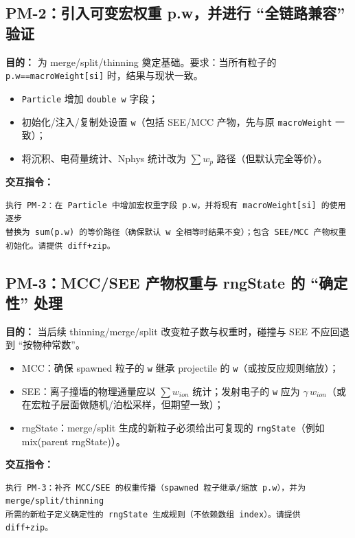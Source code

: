 \documentclass[UTF8,11pt,a4paper]{ctexart}
\begin{document}
\subsection{PM-2：引入可变宏权重 p.w，并进行 ``全链路兼容'' 验证}
\textbf{目的：} 为 merge/split/thinning 奠定基础。要求：当所有粒子的 \texttt{p.w==macroWeight[si]} 时，结果与现状一致。
\begin{itemize}[itemsep=2pt]
  \item \texttt{Particle} 增加 \texttt{double w} 字段；
  \item 初始化/注入/复制处设置 \texttt{w}（包括 SEE/MCC 产物，先与原 \texttt{macroWeight} 一致）；
  \item 将沉积、电荷量统计、Nphys 统计改为 $\sum w_p$ 路径（但默认完全等价）。
\end{itemize}
\textbf{交互指令：}
\begin{verbatim}
执行 PM-2：在 Particle 中增加宏权重字段 p.w，并将现有 macroWeight[si] 的使用逐步
替换为 sum(p.w) 的等价路径（确保默认 w 全相等时结果不变）；包含 SEE/MCC 产物权重
初始化。请提供 diff+zip。
\end{verbatim}

\subsection{PM-3：MCC/SEE 产物权重与 rngState 的 ``确定性'' 处理}
\textbf{目的：} 当后续 thinning/merge/split 改变粒子数与权重时，碰撞与 SEE 不应回退到 ``按物种常数''。
\begin{itemize}[itemsep=2pt]
  \item MCC：确保 spawned 粒子的 \texttt{w} 继承 projectile 的 \texttt{w}（或按反应规则缩放）；
  \item SEE：离子撞墙的物理通量应以 $\sum w_{ion}$ 统计；发射电子的 \texttt{w} 应为 $\gamma\,w_{ion}$（或在宏粒子层面做随机/泊松采样，但期望一致）；
  \item rngState：merge/split 生成的新粒子必须给出可复现的 \texttt{rngState}（例如 mix(parent rngState)）。
\end{itemize}
\textbf{交互指令：}
\begin{verbatim}
执行 PM-3：补齐 MCC/SEE 的权重传播（spawned 粒子继承/缩放 p.w），并为 merge/split/thinning
所需的新粒子定义确定性的 rngState 生成规则（不依赖数组 index）。请提供 diff+zip。
\end{verbatim}
\end{document}
